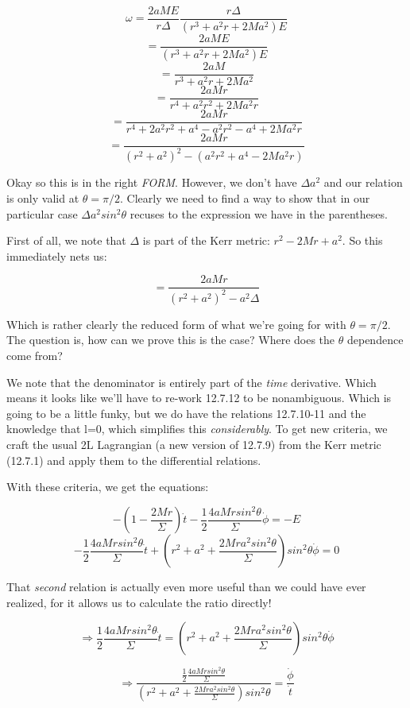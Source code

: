\documentclass[landscape,letterpaper,10pt,english]{article}
\begin{document}
\[ \omega = \frac{2aME}{r\Delta}\frac{r\Delta}{(r^3 + a^2r + 2Ma^2)E}\]
\[ = \frac{2aME}{(r^3 + a^2r + 2Ma^2)E}\]
\[ = \frac{2aM}{r^3 + a^2r + 2Ma^2}\]
\[ = \frac{2aMr}{r^4 + a^2r^2 + 2Ma^2r}\]
\[ = \frac{2aMr}{r^4 + 2a^2r^2 + a^4 - a^2r^2 - a^4 + 2Ma^2r}\]
\[ = \frac{2aMr}{(r^2+a^2)^2 - (a^2r^2 + a^4 - 2Ma^2r)}\]

    Okay so this is in the right \emph{FORM}. However, we don't have
\(\Delta a^2\) and our relation is only valid at \(\theta = \pi/2.\)
Clearly we need to find a way to show that in our particular case
\(\Delta a^2 sin^2\theta\) recuses to the expression we have in the
parentheses.

First of all, we note that \(\Delta\) is part of the Kerr metric:
\(r^2 - 2Mr + a^2\). So this immediately nets us:

\[ = \frac{2aMr}{(r^2+a^2)^2 - a^2\Delta}\]

Which is rather clearly the reduced form of what we're going for with
\(\theta = \pi/2\). The question is, how can we prove this is the case?
Where does the \(\theta\) dependence come from?

    We note that the denominator is entirely part of the \emph{time}
derivative. Which means it looks like we'll have to re-work 12.7.12 to
be nonambiguous. Which is going to be a little funky, but we do have the
relations 12.7.10-11 and the knowledge that l=0, which simplifies this
\emph{considerably}. To get new criteria, we craft the usual 2L
Lagrangian (a new version of 12.7.9) from the Kerr metric (12.7.1) and
apply them to the differential relations.

With these criteria, we get the equations:

\[ -\left( 1-\frac{2Mr}{\Sigma} \right) \dot t - \frac12 \frac{4aMrsin^2\theta}{\Sigma} \dot \phi = -E \]
\[ - \frac12 \frac{4aMrsin^2\theta}{\Sigma} \dot t + \left( r^2 + a^2 + \frac{2Mra^2sin^2\theta}{\Sigma} \right) sin^2\theta \dot \phi = 0 \]

That \emph{second} relation is actually even more useful than we could
have ever realized, for it allows us to calculate the ratio directly!

\[ \Rightarrow \frac12 \frac{4aMrsin^2\theta}{\Sigma} \dot t = \left( r^2 + a^2 + \frac{2Mra^2sin^2\theta}{\Sigma} \right) sin^2\theta \dot \phi \]

    \[ \Rightarrow \frac{\frac12 \frac{4aMrsin^2\theta}{\Sigma}}{\left( r^2 + a^2 + \frac{2Mra^2sin^2\theta}{\Sigma} \right) sin^2\theta} =  \frac{\dot \phi}{\dot t} \]
\end{document}
